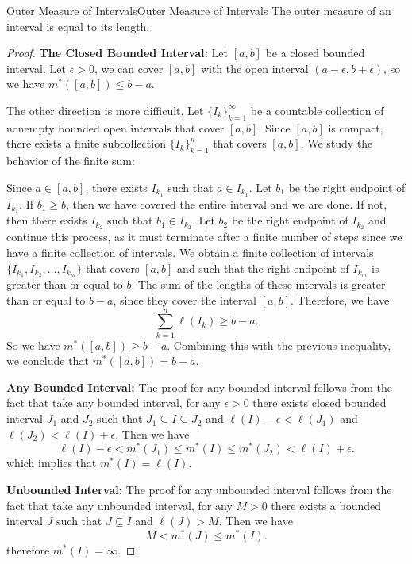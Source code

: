\documentclass[../main.tex]{subfiles}
\begin{document}
\begin{proposition}{Outer Measure of Intervals}{Outer Measure of Intervals}
  The outer measure of an interval is equal to its length.
\end{proposition}
\begin{proof}
  \textbf{The Closed Bounded Interval:} Let $[a, b]$ be a closed bounded interval. Let $\epsilon > 0$, we can cover $[a, b]$ with the open interval $(a - \epsilon, b + \epsilon)$, so we have $m^*([a, b]) \leq b - a$.

  The other direction is more difficult. Let $\{I_k\}_{k=1}^{\infty}$ be a countable collection of nonempty bounded open intervals that cover $[a, b]$. Since $[a, b]$ is compact, there exists a finite subcollection $\{I_k\}_{k=1}^{n}$ that covers $[a, b]$. We study the behavior of the finite sum:

  Since $a \in [a, b]$, there exists $I_{k_1}$ such that $a \in I_{k_1}$. Let $b_1$ be the right endpoint of $I_{k_1}$. If $b_1 \geq b$, then we have covered the entire interval and we are done. If not, then there exists $I_{k_2}$ such that $b_1 \in I_{k_2}$. Let $b_2$ be the right endpoint of $I_{k_2}$ and continue this process, as it must terminate after a finite number of steps since we have a finite collection of intervals. We obtain a finite collection of intervals $\{I_{k_1}, I_{k_2}, \ldots, I_{k_m}\}$ that covers $[a, b]$ and such that the right endpoint of $I_{k_m}$ is greater than or equal to $b$. The sum of the lengths of these intervals is greater than or equal to $b - a$, since they cover the interval $[a, b]$. Therefore, we have
  \begin{equation*}
    \sum_{k=1}^{n} \ell(I_k) \geq b - a.
  \end{equation*}
  So we have $m^*([a, b]) \geq b - a$. Combining this with the previous inequality, we conclude that $m^*([a, b]) = b - a$.

  \textbf{Any Bounded Interval:} The proof for any bounded interval follows from the fact that take any bounded interval, for any $\epsilon > 0$ there exists closed bounded interval $J_1$ and $J_2$ such that $J_1 \subseteq I \subseteq J_2$ and $\ell(I) - \epsilon < \ell(J_1)$ and $\ell(J_2) < \ell(I) + \epsilon$. Then we have
  \begin{equation*}
    \ell(I) - \epsilon < m^*(J_1) \leq m^*(I) \leq m^*(J_2) < \ell(I) + \epsilon.
  \end{equation*}
  which implies that $m^*(I) = \ell(I)$.

  \textbf{Unbounded Interval:} The proof for any unbounded interval follows from the fact that take any unbounded interval, for any $M > 0$ there exists a bounded interval $J$ such that $J \subseteq I$ and $\ell(J) > M$. Then we have
  \begin{equation*}
    M < m^*(J) \leq m^*(I).
  \end{equation*}
  therefore $m^*(I) = \infty$.
\end{proof}
\end{document}
